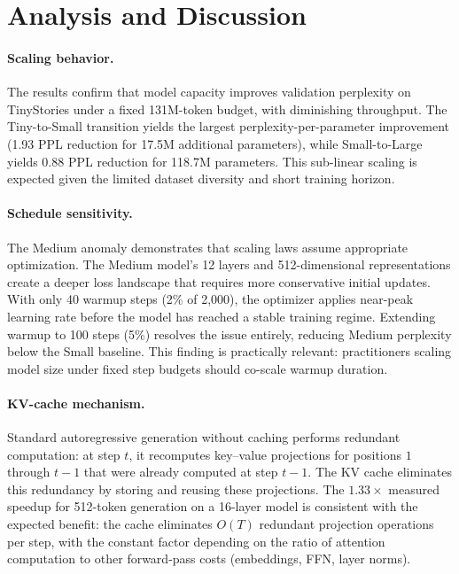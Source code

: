 \documentclass{article}
\begin{document}
\section{Analysis and Discussion}

\paragraph{Scaling behavior.} The results confirm that model capacity improves validation perplexity on TinyStories under a fixed 131M-token budget, with diminishing throughput. The Tiny-to-Small transition yields the largest perplexity-per-parameter improvement (1.93 PPL reduction for 17.5M additional parameters), while Small-to-Large yields 0.88 PPL reduction for 118.7M parameters. This sub-linear scaling is expected given the limited dataset diversity and short training horizon.

\paragraph{Schedule sensitivity.} The Medium anomaly demonstrates that scaling laws assume appropriate optimization. The Medium model's 12 layers and 512-dimensional representations create a deeper loss landscape that requires more conservative initial updates. With only 40 warmup steps (2\% of 2{,}000), the optimizer applies near-peak learning rate before the model has reached a stable training regime. Extending warmup to 100 steps (5\%) resolves the issue entirely, reducing Medium perplexity below the Small baseline. This finding is practically relevant: practitioners scaling model size under fixed step budgets should co-scale warmup duration.

\paragraph{KV-cache mechanism.} Standard autoregressive generation without caching performs redundant computation: at step $t$, it recomputes key--value projections for positions $1$ through $t{-}1$ that were already computed at step $t{-}1$. The KV cache eliminates this redundancy by storing and reusing these projections. The $1.33\times$ measured speedup for 512-token generation on a 16-layer model is consistent with the expected benefit: the cache eliminates $O(T)$ redundant projection operations per step, with the constant factor depending on the ratio of attention computation to other forward-pass costs (embeddings, FFN, layer norms).
\end{document}

